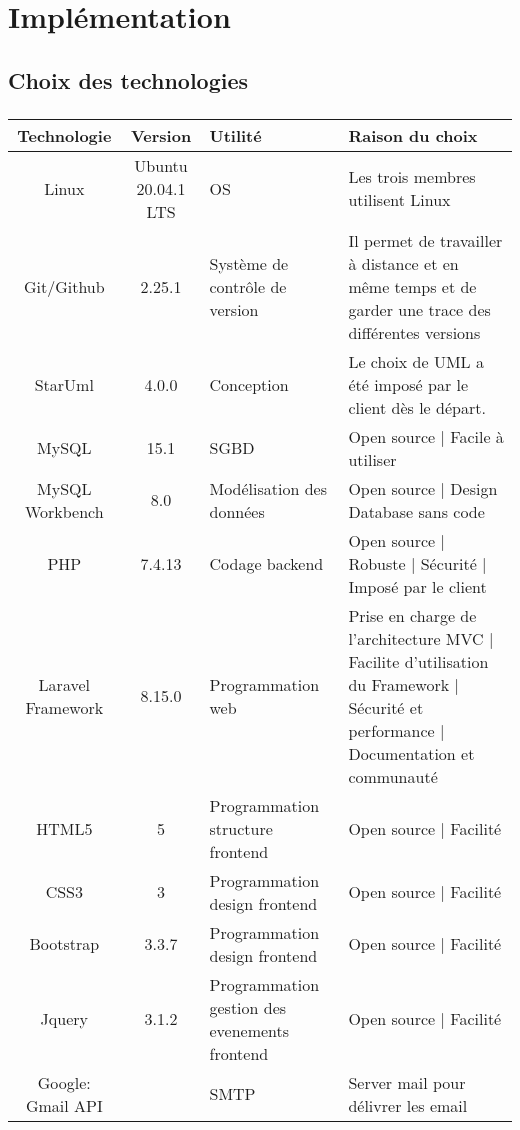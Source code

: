 \chapter{Implémentation}
        \section{Choix des technologies}
\paragraph{}   
\begin{tabular}{|c|c|p{2.7cm}|p{6cm}|}
        \hline
        Technologie & Version & Utilité & Raison du choix \\
        \hline
        Linux & Ubuntu 20.04.1 LTS & OS & Les trois membres utilisent Linux \\
        \hline
        Git/Github & 2.25.1 & Système de contrôle de version & Il permet de travailler à distance et en même temps et de garder une trace des différentes versions\\
        \hline 
        StarUml & 4.0.0 & Conception & Le choix de UML a été imposé par le client dès le départ. \\
        \hline 
        MySQL & 15.1 & SGBD & Open source | Facile à utiliser\\
        \hline 
        MySQL Workbench & 8.0 & Modélisation des données & Open source | Design Database sans code\\
        \hline
        PHP & 7.4.13 & Codage backend & Open source | Robuste | Sécurité | Imposé par le client\\
        \hline
        Laravel Framework & 8.15.0 & Programmation web & Prise en charge de l’architecture MVC | Facilite d’utilisation du Framework | Sécurité et performance | Documentation et communauté\\
        \hline
        HTML5 & 5 & Programmation structure frontend & Open source | Facilité\\
        \hline
        CSS3 & 3 & Programmation design frontend & Open source | Facilité\\
        \hline
        Bootstrap & 3.3.7 & Programmation design frontend & Open source | Facilité\\
        \hline
        Jquery & 3.1.2 & Programmation gestion des evenements frontend & Open source | Facilité\\
        \hline
        Google: Gmail API &  & SMTP & Server mail pour délivrer les email\\
        \hline
\end{tabular}
\par 

